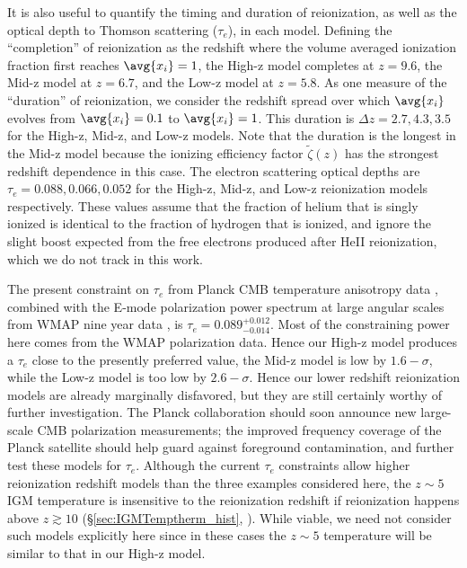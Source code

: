It is also useful to quantify the timing and duration of reionization, as well as the optical depth to Thomson scattering ($\tau_e$), in each model. 
Defining the ``completion'' of reionization as the redshift where the volume averaged ionization fraction first reaches $\avg{x_i} =1$,
the High-z model completes at $z=9.6$,
the Mid-z model at $z=6.7$, and the Low-z model at $z=5.8$. As one measure of the ``duration'' of reionization, we consider the redshift spread over which $\avg{x_i}$ evolves from
$\avg{x_i}=0.1$ to $\avg{x_i} = 1$. This duration is $\Delta z = 2.7, 4.3, 3.5$ for the High-z, Mid-z, and Low-z models. Note that the duration
is the longest in the Mid-z model because the ionizing efficiency factor $\tilde{\zeta}(z)$ has the strongest redshift dependence in this case. 
The electron scattering optical depths are $\tau_e = 0.088, 0.066, 0.052$ for the High-z, Mid-z, and Low-z reionization
models respectively. These values assume that the fraction of helium that is singly ionized is identical to the fraction of hydrogen that
is ionized, and ignore the slight boost expected from the free
electrons produced after HeII reionization, which we do not track in this work. 

The present constraint on $\tau_e$ from Planck CMB temperature anisotropy data \citep{Ade:2013zuv}, combined with the E-mode polarization power spectrum
at large angular scales from WMAP nine year data \citep{Bennett:2012zja}, is $\tau_e = 0.089^{+0.012}_{-0.014}$. Most of the constraining power here
comes from the WMAP polarization data. Hence our High-z model produces a $\tau_e$ close to the presently preferred value, the Mid-z model is low by $1.6-\sigma$, while the Low-z model is too low by $2.6-\sigma$. Hence our lower redshift reionization models are already marginally
disfavored, but they are still certainly worthy of further investigation. The Planck collaboration should soon announce new large-scale CMB
polarization measurements; the improved frequency coverage of the Planck satellite should help guard against foreground contamination, and
further test these models for $\tau_e$.
Although the current $\tau_e$ constraints allow higher reionization redshift models than the three
examples considered here, the $z \sim 5$ IGM temperature is insensitive to the reionization redshift
if reionization happens above $z \gtrsim 10$ (\S \ref{sec:IGMTemptherm_hist}, \citealt{Hui:2003hn}). While viable, we need not consider such models 
explicitly here since in these cases the $z \sim 5$ temperature will be similar to that in our High-z model.



